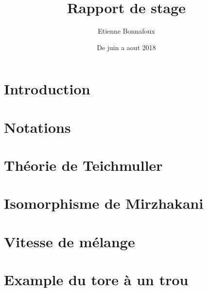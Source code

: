 \documentclass[12pt]{article}
\theoremstyle{plain}%
\theoremstyle{definition}
\theoremstyle{remark}
\begin{document}
\title{Rapport de stage}
\author{Etienne Bonnafoux}
\date{De juin a aout 2018}

\newpage

\tableofcontents
\newpage

\section{Introduction}

\newpage

\section{Notations}
\printnomenclature

\newpage

\section{Théorie de Teichmuller}

\newpage

\section{Isomorphisme de Mirzhakani}

\newpage

\section{Vitesse de mélange}

\newpage

\section{Example du tore à un trou}

\newpage



\end{document}
